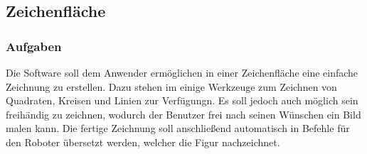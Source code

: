 
\subsection{Zeichenfläche}

\subsubsection{Aufgaben}
Die Software soll dem Anwender ermöglichen in einer Zeichenfläche eine einfache Zeichnung zu erstellen. Dazu stehen im einige Werkzeuge zum Zeichnen von Quadraten, Kreisen und Linien zur Verfügungn. Es soll jedoch auch möglich sein freihändig zu zeichnen, wodurch der Benutzer frei nach seinen Wünschen ein Bild malen kann. Die fertige Zeichnung soll anschließend automatisch in Befehle für den Roboter übersetzt werden, welcher die Figur nachzeichnet.

